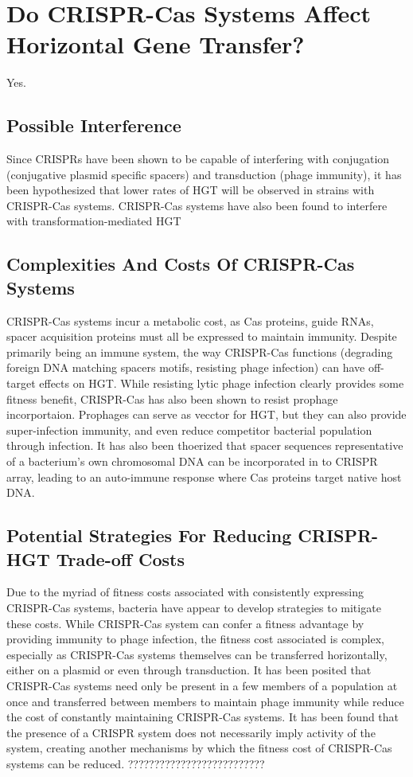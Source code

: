 \documentclass[12pt,letter]{article}
\begin{document}
\section{Do CRISPR-Cas Systems Affect Horizontal Gene Transfer?}
Yes.
\subsection{Possible Interference}
Since CRISPRs have been shown to be capable of interfering with conjugation (conjugative plasmid specific spacers) and transduction (phage immunity), it has been hypothesized that lower rates of HGT will be observed in strains with CRISPR-Cas systems\citep{staphlim}.
CRISPR-Cas systems have also been found to interfere with transformation-mediated HGT
\subsection{Complexities And Costs Of CRISPR-Cas Systems}
CRISPR-Cas systems incur a metabolic cost, as Cas proteins, guide RNAs, spacer acquisition proteins must all be expressed to maintain immunity.
Despite primarily being an immune system, the way CRISPR-Cas functions (degrading foreign DNA matching spacers motifs, resisting phage infection) can have off-target effects on HGT.
While resisting lytic phage infection clearly provides some fitness benefit, CRISPR-Cas has also been shown to resist prophage incorportaion.
Prophages can serve as vecctor for HGT, but they can also provide super-infection immunity, and even reduce competitor bacterial population through infection.
It has also been thoerized that spacer sequences representative of a bacterium's own chromosomal DNA can be incorporated in to CRISPR array, leading to an auto-immune response where Cas proteins target native host DNA.
\subsection{Potential Strategies For Reducing CRISPR-HGT Trade-off Costs}
Due to the  myriad of fitness costs associated with consistently expressing CRISPR-Cas systems, bacteria have appear to develop strategies to mitigate these costs.
While CRISPR-Cas system can confer a fitness advantage by providing immunity to phage infection, the fitness cost associated is complex, especially as CRISPR-Cas systems  themselves can be transferred  horizontally, either on a plasmid or even through transduction.
It has been posited that CRISPR-Cas systems need only be present in a few members of a population at once and transferred between members to maintain phage immunity while reduce the cost of constantly maintaining CRISPR-Cas systems.
It has been found that the presence of a CRISPR system does not necessarily imply activity of the system, creating another mechanisms by which the fitness cost of CRISPR-Cas systems can be reduced.
??????????????????????????
\end{document}
